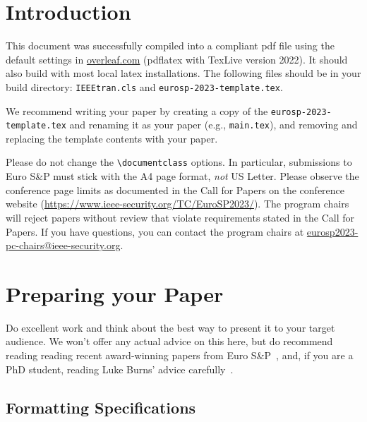 \documentclass[compsoc, conference, a4paper, 10pt, times]{IEEEtran}
\begin{document}
\section{Introduction}
This document was successfully compiled into a compliant pdf file using the default settings in \url{overleaf.com} (pdflatex with TexLive version 2022). It should also build with most local latex installations. The following files should be in your build directory: \texttt{IEEEtran.cls} and \texttt{eurosp-2023-template.tex}. 






We recommend writing your paper by creating a copy of the \texttt{eurosp-2023-template.tex} and renaming it as your paper (e.g., \texttt{main.tex}), and removing and replacing the template contents with your paper.

Please do not change the \verb-\documentclass- options. In particular, submissions to Euro S\&P must stick with the A4 page format, \emph{not} US Letter. Please observe the conference page limits as documented in the Call for Papers on the conference website (\url{https://www.ieee-security.org/TC/EuroSP2023/}). The program chairs will reject papers without review that violate requirements stated in the Call for Papers. If you have questions, you can contact the program chairs at 
\href{mailto:eurosp2023-pc-chairs@ieee-security.org}{eurosp2023-pc-chairs@ieee-security.org}.

\section{Preparing your Paper}

Do excellent work and think about the best way to present it to your target audience. We won't offer any actual advice on this here, but do recommend reading reading recent award-winning papers from Euro S\&P~\cite{fang2022costco,ahmadian2022dynamic}, and, if you are a PhD student, reading Luke Burns' advice carefully~\cite{burns2010snakes}.

\subsection{Formatting Specifications}
\end{document}

